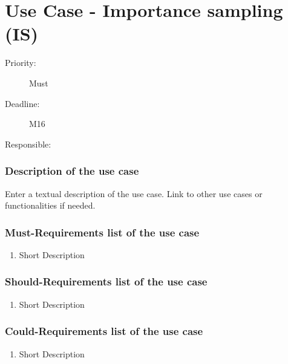 \newpage
\section{Use Case - Importance sampling (IS)}
\label{UseCase:IS}

\begin{description}
\item[Priority:] Must
\item[Deadline:] M16
\item[Responsible:]
\end{description}

\subsubsection*{Description of the use case}

Enter a textual description of the use case. Link to other use cases or functionalities if needed. 


\subsubsection*{Must-Requirements list of the use case}

\begin{enumerate}
\item Short Description
\end{enumerate}

\subsubsection*{Should-Requirements list of the use case}

\begin{enumerate}
\item Short Description
\end{enumerate}

\subsubsection*{Could-Requirements list of the use case}

\begin{enumerate}
\item Short Description
\end{enumerate}


